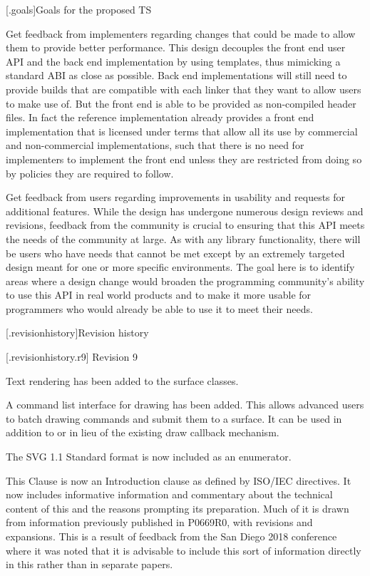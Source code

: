 [\iotwod.goals]{Goals for the proposed TS}

\pnum
Get feedback from implementers regarding changes that could be made to allow them to provide better performance. This design decouples the front end user API and the back end implementation by using templates, thus mimicking a standard ABI as close as possible. Back end implementations will still need to provide builds that are compatible with each linker that they want to allow users to make use of. But the front end is able to be provided as non-compiled header files. In fact the reference implementation already provides a front end implementation that is licensed under terms that allow all its use by commercial and non-commercial implementations, such that there is no need for implementers to implement the front end unless they are restricted from doing so by policies they are required to follow.

\pnum
Get feedback from users regarding improvements in usability and requests for additional features. While the design has undergone numerous design reviews and revisions, feedback from the \Cpp{} community is crucial to ensuring that this API meets the needs of the community at large. As with any library functionality, there will be users who have needs that cannot be met except by an extremely targeted design meant for one or more specific environments. The goal here is to identify areas where a design change would broaden the \Cpp{} programming community's ability to use this API in real world products and to make it more usable for \Cpp{} programmers who would already be able to use it to meet their needs.

[\iotwod.revisionhistory]{Revision history}

 [\iotwod.revisionhistory.r9] {Revision 9}

\pnum
Text rendering has been added to the surface classes.

\pnum
A command list interface for drawing has been added. This allows advanced users to batch drawing commands and submit them to a surface. It can be used in addition to or in lieu of the existing draw callback mechanism. 

\pnum
The SVG 1.1 Standard format is now included as an  enumerator.

\pnum
This Clause is now an Introduction clause as defined by ISO/IEC directives. It now includes informative information and commentary about the technical content of this \documenttypename{} and the reasons prompting its preparation. Much of it is drawn from information previously published in P0669R0, with revisions and expansions. This is a result of feedback from the San Diego 2018 conference where it was noted that it is advisable to include this sort of information directly in this \documenttypename{} rather than in separate papers.

